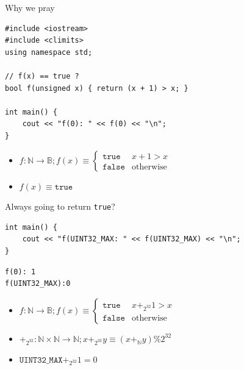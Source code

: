 \documentclass[8pt]{beamer}
\newcommand{\N}{\mathbb N}
\newcommand{\B}{\mathbb B}
\newcommand{\cpp}[1]{\texttt{#1}}
\begin{document}
\begin{frame}[fragile]{Why we pray}
\pause

{\small
\begin{verbatim}
#include <iostream>
#include <climits>
using namespace std;

// f(x) == true ?
bool f(unsigned x) { return (x + 1) > x; }

int main() {
    cout << "f(0): " << f(0) << "\n";
}
\end{verbatim}
\pause
\begin{itemize}
    \item 
        $f: \N \rightarrow \B; f(x) \equiv \begin{cases} \texttt{true} & x + 1 > x \\ \texttt{false} & \text{otherwise} \end{cases}$
        \pause
    \item $f(x) \equiv \texttt{true}$ \pause
\end{itemize}
Always going to return \cpp{true}?
\pause
\begin{verbatim}
int main() {
    cout << "f(UINT32_MAX: " << f(UINT32_MAX) << "\n";
}
\end{verbatim}
}

\pause
\begin{verbatim}
f(0): 1
f(UINT32_MAX):0
\end{verbatim}

\pause
\begin{itemize}
    \item $f: \N \rightarrow \B; f(x) \equiv \begin{cases} \texttt{true} & x +_{2^{32}} 1 > x \\ \texttt{false} & \text{otherwise} \end{cases}$ \pause
    \item $+_{2^32}: \N \times \N \rightarrow \N; x +_{2^{32}} y \equiv (x +_\N y) \% 2^{32}$ \pause 
    \item $\texttt{UINT32\_MAX} +_{2^{32}} 1 = 0 $
\end{itemize}
\end{frame}
\end{document}
